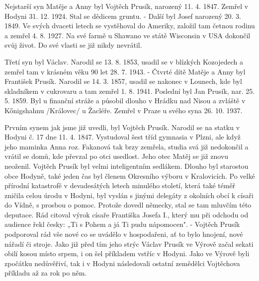\documentclass[../dejiny-rodu-prusiku.tex]{subfiles}
\begin{document}
Nejstarší syn Matěje a Anny byl Vojtěch Prusík, narozený 11. 4. 1847. Zemřel v Hodyni 31. 12. 1924. Stal se dědicem gruntu. - Další byl Josef narozený 20. 3. 1849. Ve svých dvaceti letech se vystěhoval do Ameriky, za­ložil tam četnou rodinu a zemřel 4. 8. 1927. Na své farmě u Shawano ve státě Wisconsin v USA dokončil svůj život. Do své vlasti se již nikdy nevrátil.

Třetí syn byl Václav. Narodil se 13. 8. 1853, usadil se v blízkých Kozojedech a zemřel tam v krásném věku 90 let 28. 7. 1943. - Čtvrté dítě Matěje a Anny byl František Prusík. Narodil se 14. 3. 1857, usadil se nakonec v Lounech, kde byl skladníkem v cukrovaru a tam zemřel 1. 8. 1941. Poslední byl Jan Prusík, nar. 25. 5. 1859. Byl u finanční stráže a působil dlouho v Hrádku nad Nisou a zvláště v Kőnigshahnu /Královec/ u Žacléře. Zemřel v Praze u svého syna 26. 10. 1937.

Prvním synem jak jsme již uvedli, byl Vojtěch Prusík. Narodil se na statku v Hodyni č. 17 dne 11. 4. 1847. Vystudoval šest tříd gymnasia v Plzni, ale když jeho maminka Anna roz. Fakanová tak brzy zemřela, studia svá již nedokončil a vrátil se domů, kde převzal po otci usedlost. Jeho otec Matěj se již znovu neoženil. Vojtěch Prusík byl velmi inteligentním sedlákem. Dlouho byl starostou obce Hodyně, také jeden čas byl čle­nem Okresního výboru v Kralovicích. Po velké přírodní katastrofě v devadesátých letech minulého století, kte­rá také téměř zničila celou úrodu v Hodyni, byl vyslán s jinými delegáty z okolních obcí k císaři do Vídně, s prosbou o pomoc. Protože dovedl německy, stal se tam mluvčím této deputace. Rád citoval výrok císaře Františka Josefa I., který mu při odchodu od audience řekl česky: „Ti s Pohem a já Ti pudu nápomocen". - Vojtěch Prusík podporoval rád vše nové co se uvádělo v hospodařeni, ať to bylo hnojení, nové nářadí či stroje. Jako již před tím jeho strýc Václav Prusík ve Výrově začal sekati obilí kosou místo srpem, i on šel příkladem vstříc v Hodyni. Jako ve Výrově byli zpočátku nedůvěřiví, tak i v Hodyni následovali ostatní zemědělci Vojtěchova příkladu až za rok po něm.
\end{document}
